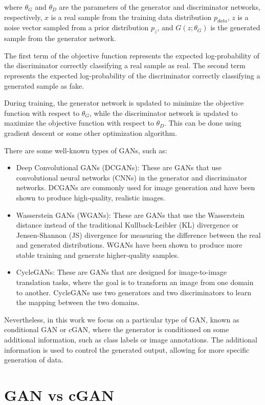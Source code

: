where $\theta_G$ and $\theta_D$ are the parameters of the generator and discriminator networks, respectively, $x$ is a real sample from the training data distribution $p_{data}$, $z$ is a noise vector sampled from a prior distribution $p_z$, and $G(z;\theta_G)$ is the generated sample from the generator network.

The first term of the objective function represents the expected log-probability of the discriminator correctly classifying a real sample as real. The second term represents the expected log-probability of the discriminator correctly classifying a generated sample as fake.

During training, the generator network is updated to minimize the objective function with respect to $\theta_G$, while the discriminator network is updated to maximize the objective function with respect to $\theta_D$. This can be done using gradient descent or some other optimization algorithm.

There are some well-known types of GANs, such as:

\begin{itemize}
	\item Deep Convolutional GANs (DCGANs): These are GANs that use convolutional neural networks (CNNs) in the generator and discriminator networks. DCGANs are commonly used for image generation and have been shown to produce high-quality, realistic images.
	\item Wasserstein GANs (WGANs): These are GANs that use the Wasserstein distance instead of the traditional Kullback-Leibler (KL) divergence or Jensen-Shannon (JS) divergence for measuring the difference between the real and generated distributions. WGANs have been shown to produce more stable training and generate higher-quality samples.
	\item CycleGANs: These are GANs that are designed for image-to-image translation tasks, where the goal is to transform an image from one domain to another. CycleGANs use two generators and two discriminators to learn the mapping between the two domains.
\end{itemize}

Nevertheless, in this work we focus on a particular type of GAN, known as conditional GAN or cGAN, where the generator is conditioned on some additional information, such as class labels or image annotations. The additional information is used to control the generated output, allowing for more specific generation of data. 

\section{GAN vs cGAN}
\label{sec:3_cGAN}

